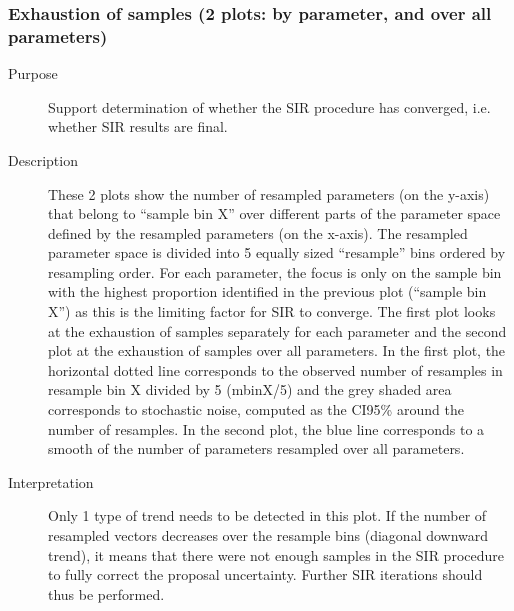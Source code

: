 \subsubsection{Exhaustion of samples (2 plots: by parameter, and over all parameters)}
\begin{description}
\item[Purpose] Support determination of whether the SIR procedure has converged, i.e. whether SIR results are final.
\item[Description] These 2 plots show the number of resampled parameters (on the y-axis) that belong to “sample bin X” over different parts of the parameter space defined by the resampled parameters (on the x-axis). The resampled parameter space is divided into 5 equally sized “resample” bins ordered by resampling order. For each parameter, the focus is only on the sample bin with the highest proportion identified in the previous plot (“sample bin X”) as this is the limiting factor for SIR to converge. The first plot looks at the exhaustion of samples separately for each parameter and the second plot at the exhaustion of samples over all parameters. In the first plot, the horizontal dotted line corresponds to the observed number of resamples in resample bin X divided by 5 (mbinX/5) and the grey shaded area corresponds to stochastic noise, computed as the CI95\% around the number of resamples. In the second plot, the blue line corresponds to a smooth of the number of parameters resampled over all parameters.
\item[Interpretation] Only 1 type of trend needs to be detected in this plot. If the number of resampled vectors decreases over the resample bins (diagonal downward trend), it means that there were not enough samples in the SIR procedure to fully correct the proposal uncertainty. Further SIR iterations should thus be performed.
\end{description}

